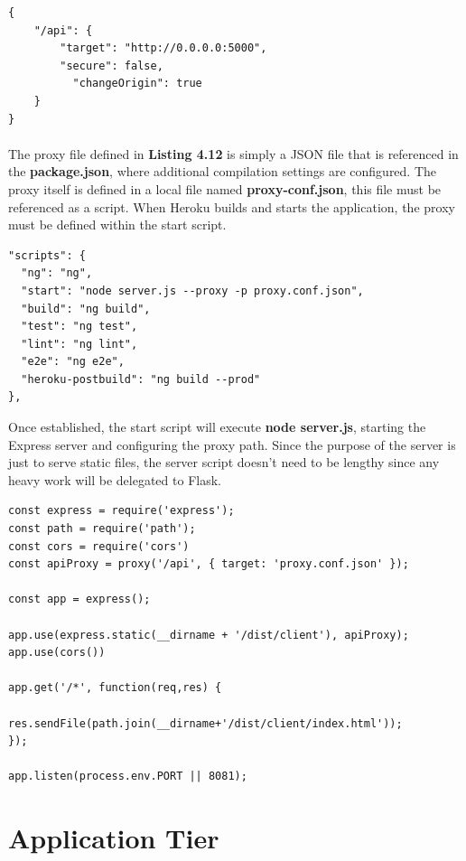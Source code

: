 \begin{lstlisting}[caption=API Proxy]
{
    "/api": {
        "target": "http://0.0.0.0:5000",
        "secure": false, 
    	  "changeOrigin": true
    }
}
\end{lstlisting}

\paragraph{}
The proxy file defined in \textbf{Listing 4.12} is simply a JSON file that is referenced in the \textbf{package.json}, where additional compilation settings are configured. The proxy itself is defined in a local file named \textbf{proxy-conf.json}, this file must be referenced as a script. When Heroku builds and starts the application, the proxy must be defined within the start script. 

\begin{lstlisting}[caption=Proxy Reference]
"scripts": {
  "ng": "ng",
  "start": "node server.js --proxy -p proxy.conf.json",
  "build": "ng build",
  "test": "ng test",
  "lint": "ng lint",
  "e2e": "ng e2e",
  "heroku-postbuild": "ng build --prod"
},
\end{lstlisting}

Once established, the start script will execute \textbf{node server.js}, starting the Express server and configuring the proxy path. Since the purpose of the server is just to serve static files, the server script doesn't need to be lengthy since any heavy work will be delegated to Flask. \newline

\begin{lstlisting}[caption=Express Server Runner]
const express = require('express');
const path = require('path');
const cors = require('cors')
const apiProxy = proxy('/api', { target: 'proxy.conf.json' });

const app = express();

app.use(express.static(__dirname + '/dist/client'), apiProxy);
app.use(cors())

app.get('/*', function(req,res) {

res.sendFile(path.join(__dirname+'/dist/client/index.html'));
});

app.listen(process.env.PORT || 8081);
\end{lstlisting}

\section{Application Tier}
